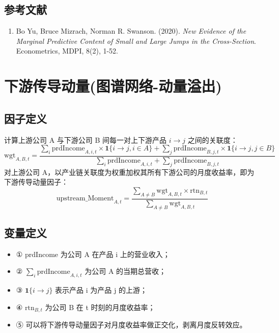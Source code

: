 \documentclass{article}
\begin{document}
\subsection{参考文献}
\begin{enumerate}
    \item Bo Yu, Bruce Mizrach, Norman R. Swanson. (2020). \textit{New Evidence of the Marginal Predictive Content of Small and Large Jumps in the Cross-Section}. Econometrics, MDPI, 8(2), 1-52.
\end{enumerate}

\section{下游传导动量(图谱网络-动量溢出)}

\subsection{因子定义}
计算上游公司 A 与下游公司 B 间每一对上下游产品 \(i \to j\) 之间的关联度：
\begin{equation}
    \mathrm{wgt}_{A,B,t} = \frac{\sum_i \mathrm{prdIncome}_{A,i,t} \times \mathbf{1}\{i \to j, i \in A\} + \sum_j \mathrm{prdIncome}_{B,j,t} \times \mathbf{1}\{i \to j, j \in B\}}{\sum_i \mathrm{prdIncome}_{A,i,t} + \sum_j \mathrm{prdIncome}_{B,j,t}}
\end{equation}
对上游公司 A，以产业链关联度为权重加权其所有下游公司的月度收益率，即为下游传导动量因子：
\begin{equation}
    \mathrm{upstream\_Moment}_{A,t} = \frac{\sum_{A \neq B} \mathrm{wgt}_{A,B,t} \times \mathrm{rtn}_{B,t}}{\sum_{A \neq B} \mathrm{wgt}_{A,B,t}}
\end{equation}

\subsection{变量定义}
\begin{itemize}
    \item ① \(\mathrm{prdIncome}\) 为公司 A 在产品 i 上的营业收入；
    \item ② \(\sum_i \mathrm{prdIncome}_{A,i,t}\) 为公司 A 的当期总营收；
    \item ③ \(\mathbf{1}\{i \to j\}\) 表示产品 i 为产品 j 的上游；
    \item ④ \(\mathrm{rtn}_{B,t}\) 为公司 B 在 t 时刻的月度收益率；
    \item ⑤ 可以将下游传导动量因子对月度收益率做正交化，剥离月度反转效应。
\end{itemize}
\end{document}
